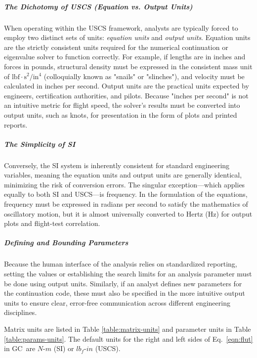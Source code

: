 \documentclass[10pt,openany,twoside]{book}
\numberwithin{equation}{section}   %
\newcommand{\Gc}{GC}
\newcommand{\Eqn}[1]{Eq.\ \ref{#1}}
\newcommand{\Tableref}[1]{Table \ref{#1}}
\begin{document}
\subparagraph{The Dichotomy of USCS (Equation vs. Output Units)} When operating
within the USCS framework, analysts are typically forced to employ two
distinct sets of units: \emph{equation units} and \emph{output units}.
Equation units are the strictly consistent units required
    for the numerical continuation or eigenvalue solver to function
    correctly. For example, if lengths are in inches and forces in
    pounds, structural density must be expressed in the consistent
    mass unit of $\text{lbf}\cdot\text{s}^2/\text{in}^4$ (colloquially
    known as "snails" or "slinches"), and velocity must be calculated
    in inches per second.  Output units are the practical units
    expected by engineers, certification authorities, and pilots. Because
    "inches per second" is not an intuitive metric for flight speed, the
    solver's results must be converted into output units, such as knots,
    for presentation in the form of plots and printed reports.

\subparagraph{The Simplicity of SI} Conversely, the SI system is inherently
consistent for standard engineering variables, meaning the equation
units and output units are generally identical, minimizing the risk of
conversion errors. The singular exception—which applies equally to
both SI and USCS—is frequency. In the formulation of the equations,
frequency must be expressed in radians per second to satisfy the
mathematics of oscillatory motion, but it is almost universally converted
to Hertz ($\text{Hz}$) for output plots and flight-test correlation.

\subparagraph{Defining and Bounding Parameters} Because the human interface
of the analysis relies on standardized reporting, setting the values or
establishing the search limits for an analysis parameter must be done
using output units. Similarly, if an analyst defines new parameters for
the continuation code, these must also be specified in the more intuitive
output units to ensure clear, error-free communication across different
engineering disciplines.


Matrix units are listed in \Tableref{table:matrix-units} and parameter
units in \Tableref{table:params-units}.
The default units for the right and left sides of \Eqn{eqn:flut} in
\Gc\ are $N\text{-}m$ (SI) or $lb_f\text{-}in$ (USCS).
\end{document}
